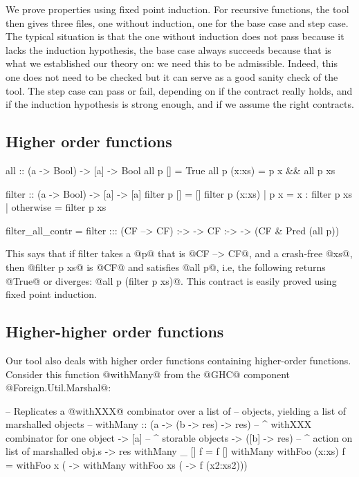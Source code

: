 We prove properties using fixed point induction. For recursive
functions, the tool then gives three files, one without induction, one
for the base case and step case. The typical situation is that the one
without induction does not pass because it lacks the induction
hypothesis, the base case always succeeds because that is what we
established our theory on: we need this to be admissible. Indeed, this
one does not need to be checked but it can serve as a good sanity
check of the tool. The step case can pass or fail, depending on if the
contract really holds, and if the induction hypothesis is strong
enough, and if we assume the right contracts.

\subsection{Higher order functions}

\begin{code}
all :: (a -> Bool) -> [a] -> Bool
all p []     = True
all p (x:xs) = p x && all p xs

filter :: (a -> Bool) -> [a] -> [a]
filter p [] = []
filter p (x:xs) | p x       = x : filter p xs
                | otherwise = filter p xs

filter_all_contr =
    filter ::: (CF --> CF) :-> \p ->
               CF :-> \xs ->
               (CF & Pred (all p))
\end{code}

This says that if filter takes a @p@ that is @CF --> CF@, and a
crash-free @xs@, then @filter p xs@ is @CF@ and satisfies @all p@,
i.e, the following returns @True@ or diverges:
@all p (filter p xs)@.
This contract is easily proved using fixed point induction.


\subsection{Higher-higher order functions}

Our tool also deals with higher order functions containing
higher-order functions. Consider this function @withMany@ from the
@GHC@ component @Foreign.Util.Marshal@:

\begin{code}
-- Replicates a @withXXX@ combinator over a list of
-- objects, yielding a list of marshalled objects
--
withMany :: (a -> (b -> res) -> res)
         -- ^ withXXX combinator for one object
         -> [a]
         -- ^ storable objects
         -> ([b] -> res)
         -- ^ action on list of marshalled obj.s
         -> res
withMany _       []     f = f []
withMany withFoo (x:xs) f = withFoo x ( ->
      withMany withFoo xs ( -> f (x2:xs2)))

\end{code}

